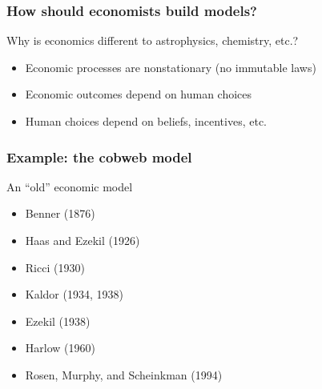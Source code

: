 \documentclass[
    xcolor={svgnames,dvipsnames},
    hyperref={colorlinks, citecolor=DeepPink4, linkcolor=DarkRed, urlcolor=DarkBlue}
    ]{beamer}  %
\newcommand{\Eg}{\textcolor{ForestGreen}{Example. }}
\newcommand{\1}{\mathbbm 1}
\begin{document}
\begin{frame}
    \frametitle{How should economists build models?}

    Why is economics different to astrophysics, chemistry, etc.?
            \vspace{0.3em}
            \vspace{0.3em}
            \vspace{0.3em}

    \begin{itemize}
        \item Economic processes are nonstationary (no immutable laws)
            \vspace{0.3em}
            \vspace{0.3em}
            \vspace{0.3em}
        \item Economic outcomes depend on human choices
            \vspace{0.3em}
            \vspace{0.3em}
            \vspace{0.3em}
        \item Human choices depend on beliefs, incentives, etc.
    \end{itemize}



\end{frame}

\begin{frame}
    \frametitle{Example: the cobweb model}

    An ``old'' economic model

    \begin{itemize}
        \item Benner (1876)
        \item Haas and Ezekil (1926)
        \item Ricci (1930)
        \item Kaldor (1934, 1938)
        \item Ezekil (1938)
        \item Harlow (1960)
        \item Rosen, Murphy, and Scheinkman (1994)
    \end{itemize}

\end{frame}
\end{document}
